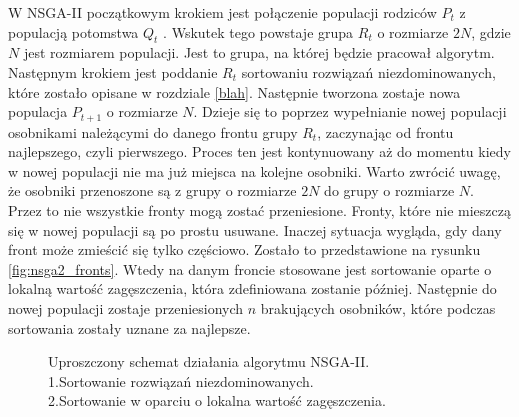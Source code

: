 \documentclass[twoside]{iisthesis}
\begin{document}
W NSGA-II początkowym krokiem jest połączenie populacji rodziców $P_{t}$ z populacją potomstwa $Q_{t}$ \cite{nsga}. Wskutek tego powstaje grupa $R_{t}$ o rozmiarze $2N$, gdzie $N$ jest rozmiarem populacji. Jest to grupa, na której będzie pracował algorytm. Następnym krokiem jest poddanie $R_{t}$ sortowaniu rozwiązań niezdominowanych, które zostało opisane w rozdziale \ref{blah}. Następnie tworzona zostaje nowa populacja $P_{t+1}$ o rozmiarze $N$. Dzieje się to poprzez wypełnianie nowej populacji osobnikami należącymi do danego frontu grupy $R_{t}$, zaczynając od frontu najlepszego, czyli pierwszego. Proces ten jest kontynuowany aż do momentu kiedy w nowej populacji nie ma już miejsca na kolejne osobniki. Warto zwrócić uwagę, że osobniki przenoszone są z grupy o rozmiarze $2N$ do grupy o rozmiarze $N$. Przez to nie wszystkie fronty mogą zostać przeniesione. Fronty, które nie mieszczą się w nowej populacji są po prostu usuwane. Inaczej sytuacja wygląda, gdy dany front może zmieścić się tylko częściowo. Zostało to przedstawione na rysunku \eqref{fig:nsga2_fronts}. Wtedy na danym froncie stosowane jest sortowanie oparte o lokalną wartość zagęszczenia, która zdefiniowana zostanie później. Następnie do nowej populacji zostaje przeniesionych $n$ brakujących osobników, które podczas sortowania zostały uznane za najlepsze.
\begin{figure}[!htb]
	\centering
	\caption{Uproszczony schemat działania algorytmu NSGA-II.\\1.Sortowanie rozwiązań niezdominowanych.\\2.Sortowanie w oparciu o lokalna wartość zagęszczenia.}
	\label{fig:nsga2_fronts}
\end{figure}
\end{document}
